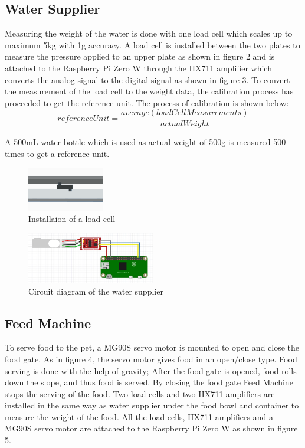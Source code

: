 \documentclass[conference]{IEEEtran}
\begin{document}
\subsection{Water Supplier}
Measuring the weight of the water is done with one load cell which scales up to maximum 5kg with 1g accuracy. A load cell is installed between the two plates to measure the pressure applied to an upper plate as shown in figure 2 and is attached to the Raspberry Pi Zero W through the HX711 amplifier which converts the analog signal to the digital signal as shown in figure 3. To convert the measurement of the load cell to the weight data, the calibration process has proceeded to get the reference unit. The process of calibration is shown below:
\[
	referenceUnit = \frac{average(loadCellMeasurements)}{actualWeight}
\]

A 500mL water bottle which is used as actual weight of 500g is measured 500 times to get a reference unit.

\begin{figure}[htbp]
\centerline{\includegraphics[width=0.3\textwidth]{./images/load-cell.png}}
\caption{Installaion of a load cell}
\label{fig}
\end{figure}

\begin{figure}[htbp]
\centerline{\includegraphics[width=0.5\textwidth]{./images/water supplier circuit.jpg}}
\caption{Circuit diagram of the water supplier}
\label{fig}
\end{figure}

\subsection{Feed Machine}
To serve food to the pet, a MG90S servo motor is mounted to open and close the food gate. As in figure 4, the servo motor gives food in an open/close type. Food serving is done with the help of gravity; After the food gate is opened, food rolls down the slope, and thus food is served. By closing the food gate Feed Machine stops the serving of the food. Two load cells and two HX711 amplifiers are installed in the same way as water supplier under the food bowl and container to measure the weight of the food. All the load cells, HX711 amplifiers and a MG90S servo motor are attached to the Raspberry Pi Zero W as shown in figure 5.
\end{document}
